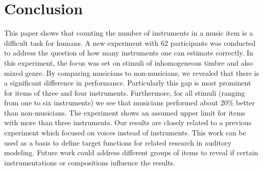 \section{Conclusion}
This paper shows that counting the number of instruments in a music item is a difficult task for humans. A new experiment with 62 participants was conducted to address the question of how many instruments one can estimate correctly.
In this experiment, the focus was set on stimuli of inhomogeneous timbre and also mixed genre. By comparing musicians to non-musicians, we revealed that there is a significant difference in performance. Particularly this gap is most prominent for items of three and four instruments. Furthermore, for all stimuli (ranging from one to six instruments) we see that musicians performed about 20\% better than non-musicians. The experiment shows an assumed upper limit for items with more than three instruments. Our results are closely related to a previous experiment which focused on voices instead of instruments.
This work can be used as a basis to define target functions for related research in auditory modeling. Future work could address different groups of items to reveal if certain instrumentations or compositions influence the results.

% 
%
